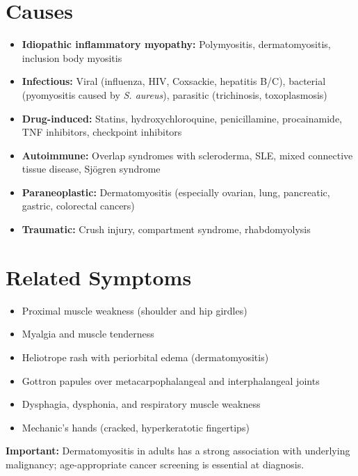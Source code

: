 \section*{Causes}
\begin{itemize}
  \item \textbf{Idiopathic inflammatory myopathy:} Polymyositis, dermatomyositis, inclusion body myositis
  \item \textbf{Infectious:} Viral (influenza, HIV, Coxsackie, hepatitis B/C), bacterial (pyomyositis caused by \textit{S. aureus}), parasitic (trichinosis, toxoplasmosis)
  \item \textbf{Drug-induced:} Statins, hydroxychloroquine, penicillamine, procainamide, TNF inhibitors, checkpoint inhibitors
  \item \textbf{Autoimmune:} Overlap syndromes with scleroderma, SLE, mixed connective tissue disease, Sj\"{o}gren syndrome
  \item \textbf{Paraneoplastic:} Dermatomyositis (especially ovarian, lung, pancreatic, gastric, colorectal cancers)
  \item \textbf{Traumatic:} Crush injury, compartment syndrome, rhabdomyolysis
\end{itemize}

\section*{Related Symptoms}
\begin{itemize}
  \item Proximal muscle weakness (shoulder and hip girdles)
  \item Myalgia and muscle tenderness
  \item Heliotrope rash with periorbital edema (dermatomyositis)
  \item Gottron papules over metacarpophalangeal and interphalangeal joints
  \item Dysphagia, dysphonia, and respiratory muscle weakness
  \item Mechanic's hands (cracked, hyperkeratotic fingertips)
\end{itemize}
\textbf{Important:} Dermatomyositis in adults has a strong association with underlying malignancy; age-appropriate cancer screening is essential at diagnosis.

